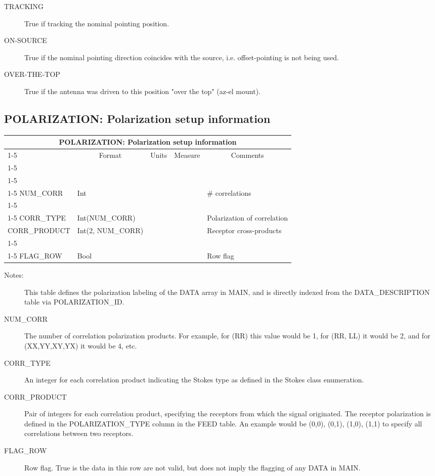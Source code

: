 \documentclass{article}
\newcommand{\defline}[1]{\cline{1-5}
\multicolumn{5}{|l|}{#1} \\
\cline{1-5}}
\newcommand{\definetable}[2]
{
	\vfill\newpage
	\subsection{#1}
        \vspace{0.15in}
        \small
	\begin{tabular}{|l|p{1.25in}|l|p{.9in}|p{1.4in}|}
	\hline
	\multicolumn{5}{|c|}{\bf #1}\\ 
	\cline{1-5}
        \multicolumn{1}{|c|}{Name}&\multicolumn{1}{|c|}{Format}&
        \multicolumn{1}{|c|}{Units}&\multicolumn{1}{|c|}{Measure}&
        \multicolumn{1}{|c|}{Comments}\\
        \cline{1-5}
        #2
        \hline
	\end{tabular}
}
\begin{document}
\begin{itemize}
\begin{description}
\item[TRACKING] True if tracking the nominal pointing position.

\item[ON-SOURCE] True if the nominal pointing direction coincides with
the source, i.e. offset-pointing is not being used.

\item[OVER-THE-TOP] True if the antenna was driven to this position
"over the top" (az-el mount).
\end{description}

\definetable{POLARIZATION: Polarization setup information}{
\defline{\bf Columns}
\defline{\em Data description columns}
NUM\_CORR   &     Int  &           &        & \# correlations\\
\defline{\em Data}  
CORR\_TYPE & Int(NUM\_CORR) & & & Polarization of correlation \\
CORR\_PRODUCT &  Int(2, NUM\_CORR) &  & & Receptor cross-products \\  
\defline{\em Flags}
FLAG\_ROW & Bool & & & Row flag\\
}
\begin{description}

\item[Notes:] This table defines the polarization labeling of the DATA
array in MAIN, and is directly indexed from the DATA\_DESCRIPTION
table via POLARIZATION\_ID.

\item[NUM\_CORR] The number of correlation polarization products. For
example, for (RR) this value would be 1, for (RR, LL) it would be 2,
and for (XX,YY,XY,YX) it would be 4, etc.

\item[CORR\_TYPE] An integer for each correlation product indicating
the Stokes type as defined in the Stokes class enumeration.

\item[CORR\_PRODUCT] Pair of integers for each correlation product,
specifying the receptors from which the signal originated.  The
receptor polarization is defined in the POLARIZATION\_TYPE column in
the FEED table. An example would be (0,0), (0,1), (1,0), (1,1) to
specify all correlations between two receptors.

\item[FLAG\_ROW] Row flag. True is the data in this row are not valid,
but does not imply the flagging of any DATA in MAIN.

\end{description}


\end{itemize}
\end{document}
